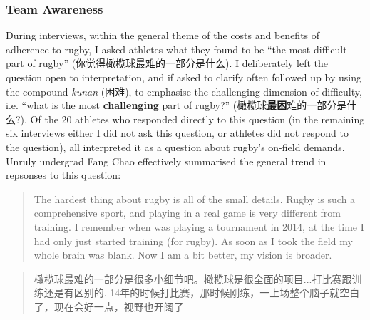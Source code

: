 \begin{CJK}{UTF8}{gbsn}


\subsubsection{Team Awareness}
During interviews, within the general theme of the costs and benefits of adherence to rugby, I asked athletes what they found to be ``the most difficult part of rugby'' (你觉得橄榄球最难的一部分是什么).  I deliberately left the question open to interpretation, and if asked to clarify often followed up by using the compound \textit{kunan} (困难), to emphasise the challenging dimension of difficulty, i.e. ``what is the most \textbf{challenging} part of rugby?'' (橄榄球\textbf{最困}难的一部分是什么?). Of the 20 athletes who responded directly to this question (in the remaining six interviews either I did not ask this question, or athletes did not respond to the question), all interpreted it as a question about rugby's on-field demands.  Unruly undergrad Fang Chao effectively summarised the general trend in repsonses to this question:

\begin{quote}
  The hardest thing about rugby is all of the small details. Rugby is such a comprehensive sport, and playing in a real game is very different from training. I remember when was playing a tournament in 2014, at the time I had only just started training (for rugby).  As soon as I took the field my whole brain was blank.  Now I am a bit better, my vision is broader.
\end{quote}

\begin{quote}
  橄榄球最难的一部分是很多小细节吧。橄榄球是很全面的项目...打比赛跟训练还是有区别的. 14年的时候打比赛，那时候刚练，一上场整个脑子就空白了，现在会好一点，视野也开阔了
\end{quote}


\end{CJK}

